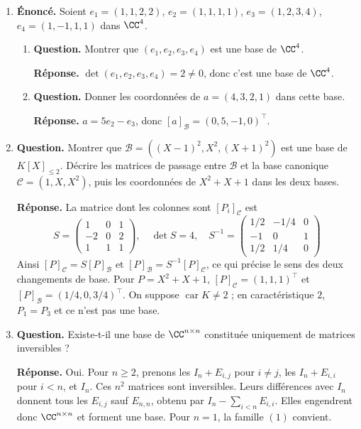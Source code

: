 \documentclass[12pt, a4paper]{article}
\begin{document}
\begin{enumerate}[label=6.\arabic*., start=105]
  \item \begin{minipage}[t]{\linewidth}\raggedright
\textbf{Énoncé.} Soient $e_1=(1,1,2,2)$, $e_2=(1,1,1,1)$, $e_3=(1,2,3,4)$, $e_4=(1,-1,1,1)$ dans $\CC^4$.

\begin{enumerate}[\arabic*.]
        \item \textbf{Question.} Montrer que $(e_1,e_2,e_3,e_4)$ est une base de $\CC^4$.
\par\smallskip
\textbf{Réponse.} $\det(e_1,e_2,e_3,e_4)=2\neq0$, donc c'est une base de $\CC^4$.

  \item \textbf{Question.} Donner les coordonnées de $a=(4,3,2,1)$ dans cette base.
\par\smallskip
\textbf{Réponse.} $a=5e_2-e_3$, donc $[a]_{\mathcal B}=(0,5,-1,0)^\top$.

\end{enumerate}
\end{minipage}

  \item \begin{minipage}[t]{\linewidth}\raggedright
\textbf{Question.} Montrer que $\mathcal B=((X-1)^2,X^2,(X+1)^2)$ est une base de $K[X]_{\leq2}$. Décrire les matrices de passage entre $\mathcal B$ et la base canonique $\mathcal C=(1,X,X^2)$, puis les coordonnées de $X^2+X+1$ dans les deux bases.
\par\smallskip
\textbf{Réponse.} La matrice dont les colonnes sont $[P_i]_{\mathcal C}$ est
    \[
      S=\begin{pmatrix}1&0&1\\-2&0&2\\1&1&1\end{pmatrix},\quad \det S=4,\quad
      S^{-1}=\begin{pmatrix}1/2&-1/4&0\\-1&0&1\\1/2&1/4&0\end{pmatrix}
    \]
    Ainsi $[P]_{\mathcal C}=S[P]_{\mathcal B}$ et $[P]_{\mathcal B}=S^{-1}[P]_{\mathcal C}$, ce qui précise le sens des deux changements de base.
    Pour $P=X^2+X+1$, $[P]_{\mathcal C}=(1,1,1)^\top$ et $[P]_{\mathcal B}=(1/4,0,3/4)^\top$.
    On suppose $\operatorname{car}K\neq2$ ; en caractéristique $2$, $P_1=P_3$ et ce n'est pas une base.
\end{minipage}

  \item \begin{minipage}[t]{\linewidth}\raggedright
\textbf{Question.} Existe-t-il une base de $\CC^{n\times n}$ constituée uniquement de matrices inversibles ?
\par\smallskip
\textbf{Réponse.} Oui. Pour $n\geq2$, prenons les $I_n+E_{i,j}$ pour $i\neq j$, les $I_n+E_{i,i}$ pour $i<n$, et $I_n$.
    Ces $n^2$ matrices sont inversibles.
    Leurs différences avec $I_n$ donnent tous les $E_{i,j}$ sauf $E_{n,n}$, obtenu par $I_n-\sum_{i<n}E_{i,i}$.
    Elles engendrent donc $\CC^{n\times n}$ et forment une base.
    Pour $n=1$, la famille $(1)$ convient.
\end{minipage}


\end{enumerate}
\end{document}
